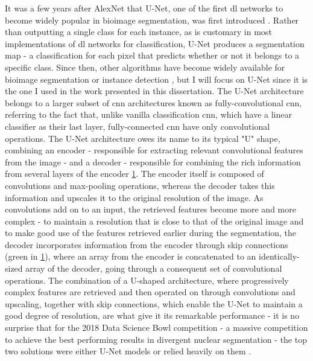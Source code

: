 It was a few years after AlexNet that U-Net, one of the first \ac{dl} networks to become widely popular in bioimage segmentation, was first introduced \cite{Ronneberger2015-do}. Rather than outputting a single class for each instance, as is customary in most implementations of \ac{dl} networks for classification, U-Net produces a segmentation map - a classification for each pixel that predicts whether or not it belongs to a specific class. Since then, other algorithms have become widely available for bioimage segmentation or instance detection \cite{Lucas2021-hc}, but I will focus on U-Net since it is the one I used in the work presented in this dissertation. The U-Net architecture belongs to a larger subset of \ac{cnn} architectures known as fully-convolutional \ac{cnn}, referring to the fact that, unlike vanilla classification \ac{cnn}, which have a linear classifier as their last layer, fully-connected \ac{cnn} have only convolutional operations. The U-Net architecture owes its name to its typical "U" shape, combining an encoder - responsible for extracting relevant convolutional features from the image - and a decoder - responsible for combining the rich information from several layers of the encoder \ref{fig:u-net}. The encoder itself is composed of convolutions and max-pooling operations, whereas the decoder takes this information and upscales it to the original resolution of the image. As convolutions add on to an input, the retrieved features become more and more complex - to maintain a resolution that is close to that of the original image and to make good use of the features retrieved earlier during the segmentation, the decoder incorporates information from the encoder through skip connections (green in \ref{fig:u-net}), where an array from the encoder is concatenated to an identically-sized array of the decoder, going through a consequent set of convolutional operations. The combination of a U-shaped architecture, where progressively complex features are retrieved and then operated on through convolutions and upscaling, together with skip connections, which enable the U-Net to maintain a good degree of resolution, are what give it its remarkable performance - it is no surprise that for the 2018 Data Science Bowl competition - a massive competition to achieve the best performing results in divergent nuclear segmentation - the top two solutions were either U-Net models or relied heavily on them \cite{Seferbekov_undated-br,jacobkie_undated-tc}. 

\begin{figure}
	\label{fig:u-net}
\end{figure}


